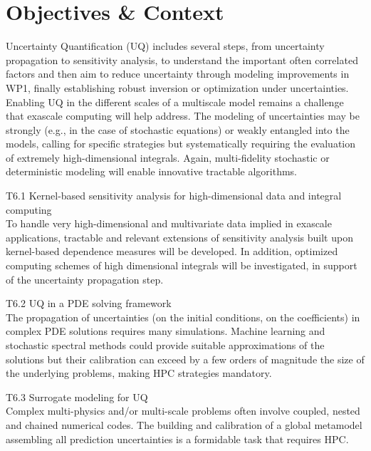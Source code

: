 
\section{Objectives \& Context}

Uncertainty Quantification (UQ) includes several steps, from uncertainty propagation to sensitivity
analysis, to understand the important often correlated factors and then aim to reduce uncertainty
through modeling improvements in WP1, finally establishing robust inversion or optimization under
uncertainties. Enabling UQ in the different scales of a multiscale model remains a challenge that
exascale computing will help address. The modeling of uncertainties may be strongly (e.g., in the case
of stochastic equations) or weakly entangled into the models, calling for specific strategies but
systematically requiring the evaluation of extremely high-dimensional integrals. Again, multi-fidelity
stochastic or deterministic modeling will enable innovative tractable algorithms.

T6.1 Kernel-based sensitivity analysis for high-dimensional data and integral computing\\
To handle very high-dimensional and multivariate data implied in exascale applications, tractable and
relevant extensions of sensitivity analysis built upon kernel-based dependence measures will be
developed. In addition, optimized computing schemes of high dimensional integrals will be
investigated, in support of the uncertainty propagation step.

T6.2 UQ in a PDE solving framework \\
The propagation of uncertainties (on the initial conditions,
on the coefficients) in complex PDE solutions requires many simulations. Machine learning and
stochastic spectral methods could provide suitable approximations of the solutions but their calibration
can exceed by a few orders of magnitude the size of the underlying problems, making HPC strategies
mandatory.

T6.3 Surrogate modeling for UQ\\
 Complex multi-physics and/or multi-scale problems often involve
coupled, nested and chained numerical codes. The building and calibration of a global metamodel
assembling all prediction uncertainties is a formidable task that requires HPC.

